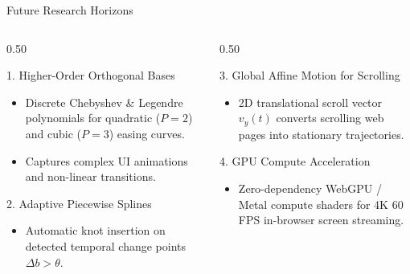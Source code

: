 \documentclass[aspectratio=169, 10pt]{beamer}
\begin{document}
\begin{frame}{Future Research Horizons}
    \begin{columns}
        \begin{column}{0.50\textwidth}
            \begin{block}{1. Higher-Order Orthogonal Bases}
                \begin{itemize}
                    \item Discrete Chebyshev \& Legendre polynomials for quadratic ($P=2$) and cubic ($P=3$) easing curves.
                    \item Captures complex UI animations and non-linear transitions.
                \end{itemize}
            \end{block}
            \begin{block}{2. Adaptive Piecewise Splines}
                \begin{itemize}
                    \item Automatic knot insertion on detected temporal change points $\Delta b > \theta$.
                \end{itemize}
            \end{block}
        \end{column}
        \begin{column}{0.50\textwidth}
            \begin{block}{3. Global Affine Motion for Scrolling}
                \begin{itemize}
                    \item 2D translational scroll vector $v_y(t)$ converts scrolling web pages into stationary trajectories.
                \end{itemize}
            \end{block}
            \begin{block}{4. GPU Compute Acceleration}
                \begin{itemize}
                    \item Zero-dependency WebGPU / Metal compute shaders for 4K 60 FPS in-browser screen streaming.
                \end{itemize}
            \end{block}
        \end{column}
    \end{columns}
\end{frame}
\end{document}
